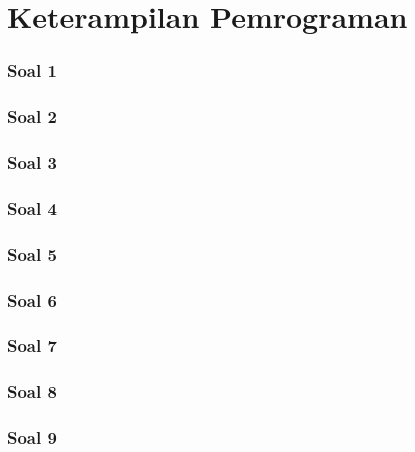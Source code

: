 \chapter{Keterampilan Pemrograman}
\subsection*{Soal 1}
	
\subsection*{Soal 2}
    	
\subsection*{Soal 3}
    	
\subsection*{Soal 4}
    	
\subsection*{Soal 5}
    	
\subsection*{Soal 6}
		
\subsection*{Soal 7}
    	
\subsection*{Soal 8}
    	
\subsection*{Soal 9}
    

